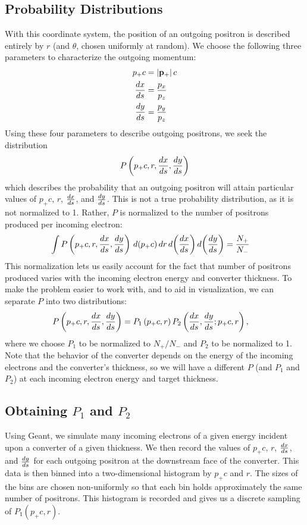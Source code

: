 \documentclass[12pt]{article}
\begin{document}
\subsection{Probability Distributions}
With this coordinate system, the position of an outgoing positron is described entirely by $r$ (and $\theta$, chosen uniformly at random).
We choose the following three parameters to characterize the outgoing momentum:
\begin{align}
p_+ c & = \left| \mathbf{p}_+ \right| c \\
\frac{dx}{ds} & = \frac{p_x}{p_z} \\
\frac{dy}{ds} & = \frac{p_y}{p_z}
\end{align}
Using these four parameters to describe outgoing positrons, we seek the distribution
\begin{align}
P \left( p_+ c, r, \frac{dx}{ds}, \frac{dy}{ds} \right)
\end{align}
which describes the probability that an outgoing positron will attain particular values of $p_+ c$, $r$, $\frac{dx}{ds}$, and $\frac{dy}{ds}$.
This is not a true probability distribution, as it is not normalized to 1.
Rather, $P$ is normalized to the number of positrons produced per incoming electron:
\begin{align}
\int P \left( p_+ c, r, \frac{dx}{ds}, \frac{dy}{ds} \right) \, d(p_+ c) \, dr \, d \! \left( \frac{dx}{ds} \right) d \! \left( \frac{dy}{ds} \right) & = \frac{N_+}{N_-}
\end{align}
This normalization lets us easily account for the fact that number of positrons produced varies with the incoming electron energy and converter thickness.
To make the problem easier to work with, and to aid in visualization, we can separate $P$ into two distributions:
\begin{align}
P \left( p_+ c, r, \frac{dx}{ds}, \frac{dy}{ds} \right) & = P_1 \left( p_+ c, r \right) P_2 \left( \frac{dx}{ds}, \frac{dy}{ds} ; p_+ c , r \right),
\end{align}
where we choose $P_1$ to be normalized to $N_+/N_-$ and $P_2$ to be normalized to 1.
Note that the behavior of the converter depends on the energy of the incoming electrons and the converter's thickness, so we will have a different $P$ (and $P_1$ and $P_2$) at each incoming electron energy and target thickness.

\subsection{Obtaining $P_1$ and $P_2$}

Using Geant\cite{geant}, we simulate many incoming electrons of a given energy incident upon a converter of a given thickness.
We then record the values of $p_+ c$, $r$, $\frac{dx}{ds}$, and $\frac{dy}{ds}$ for each outgoing positron at the downstream face of the converter.
This data is then binned into a two-dimensional histogram by $p_+ c$ and $r$.
The sizes of the bins are chosen non-uniformly so that each bin holds approximately the same number of positrons.
This histogram is recorded and gives us a discrete sampling of $P_1(p_+c, r)$.
\end{document}
